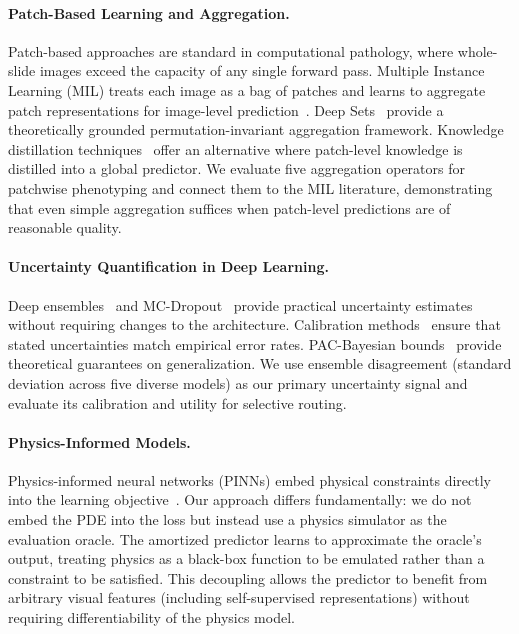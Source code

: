 \documentclass[11pt,a4paper]{article}
\begin{document}
\paragraph{Patch-Based Learning and Aggregation.}
Patch-based approaches are standard in computational pathology, where whole-slide images exceed the capacity of any single forward pass.
Multiple Instance Learning (MIL) treats each image as a bag of patches and learns to aggregate patch representations for image-level prediction~\citep{ilse2018attention, lu2021mil, patel2024mil_survey}.
Deep Sets~\citep{zaheer2017deepsets} provide a theoretically grounded permutation-invariant aggregation framework.
Knowledge distillation techniques~\citep{hinton2015distilling} offer an alternative where patch-level knowledge is distilled into a global predictor.
We evaluate five aggregation operators for patchwise phenotyping and connect them to the MIL literature, demonstrating that even simple aggregation suffices when patch-level predictions are of reasonable quality.

\paragraph{Uncertainty Quantification in Deep Learning.}
Deep ensembles~\citep{lakshminarayanan2017simple} and MC-Dropout~\citep{gal2016dropout} provide practical uncertainty estimates without requiring changes to the architecture.
Calibration methods~\citep{maronas2021calibration} ensure that stated uncertainties match empirical error rates.
PAC-Bayesian bounds~\citep{mcallester2003pac} provide theoretical guarantees on generalization.
We use ensemble disagreement (standard deviation across five diverse models) as our primary uncertainty signal and evaluate its calibration and utility for selective routing.

\paragraph{Physics-Informed Models.}
Physics-informed neural networks (PINNs) embed physical constraints directly into the learning objective~\citep{raissi2019pinn}.
Our approach differs fundamentally: we do not embed the PDE into the loss but instead use a physics simulator as the evaluation oracle.
The amortized predictor learns to approximate the oracle's output, treating physics as a black-box function to be emulated rather than a constraint to be satisfied.
This decoupling allows the predictor to benefit from arbitrary visual features (including self-supervised representations) without requiring differentiability of the physics model.
\end{document}
